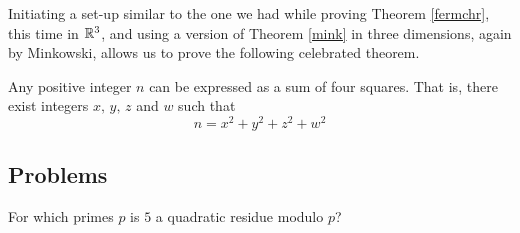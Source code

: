 \begin{remark}
Initiating a set-up similar to the one we had while proving Theorem \ref{fermchr}, this time in $\mathbb R^3$, and using a version of Theorem \ref{mink} in three dimensions, again by Minkowski, allows us to prove the following celebrated theorem.
\begin{theorem*}
Any positive integer $n$ can be expressed as a sum of four squares. That is, there exist integers $x,\,y,\,z$ and $w$ such that 
\[n = x^2 + y^2 + z^2 + w^2\]
\end{theorem*} 
\end{remark}

\vspace*{0.5in}

\subsection{Problems}
\vspace{0.1in}

\begin{problem}\label{Problem 18.1}
For which primes $p$ is $5$ a quadratic residue modulo $p$?
\end{problem}